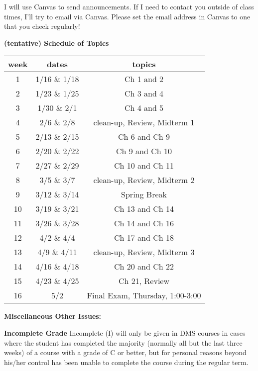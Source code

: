 \documentclass[12pt]{article}
\begin{document}
I will use Canvas to send announcements.  If I need to contact you outside of class times, I'll try to email via Canvas.  Please set the email address in Canvas to one that you check regularly!



\begin{center}
\textbf{(tentative) Schedule of Topics}\\

\begin{tabular}{c | c || c}
week & dates &topics \\
\hline \hline
1& 1/16 \& 1/18 &Ch 1 and 2\\ \hline
2& 1/23 \& 1/25& Ch 3 and 4\\ \hline
3& 1/30 \& 2/1 & Ch 4 and 5\\ \hline
4& 2/6 \& 2/8 & clean-up, Review, Midterm 1\\ \hline
5& 2/13 \& 2/15& Ch 6 and Ch 9 \\ \hline
6& 2/20 \& 2/22& Ch 9 and Ch 10 \\ \hline
7& 2/27 \& 2/29& Ch 10 and Ch 11 \\ \hline
8& 3/5 \& 3/7& clean-up, Review, Midterm 2\\ \hline
9& 3/12 \& 3/14 &Spring Break\\ \hline
10& 3/19 \& 3/21& Ch 13 and Ch 14  \\ \hline
11& 3/26 \& 3/28& Ch 14 and Ch 16 \\ \hline
12& 4/2 \& 4/4& Ch 17 and Ch 18\\ \hline
13& 4/9 \& 4/11&clean-up, Review, Midterm 3\\ \hline
14& 4/16 \& 4/18&Ch 20 and Ch 22\\ \hline
15& 4/23 \& 4/25&Ch 21, Review\\ \hline
16& 5/2& Final Exam, Thursday, 1:00-3:00\\ 
\end{tabular}
\end{center}

\newpage


\textbf{Miscellaneous Other Issues:}

\textbf{Incomplete Grade} 
Incomplete (I) will only be given in DMS courses in cases where the student has completed the majority (normally all but the last three weeks) of a course with a grade of C or better, but for personal reasons beyond his/her control has been unable to complete the course during the regular term. 
\end{document}

